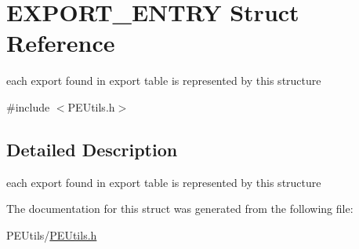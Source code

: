 \hypertarget{struct_e_x_p_o_r_t___e_n_t_r_y}{}\section{E\+X\+P\+O\+R\+T\+\_\+\+E\+N\+T\+RY Struct Reference}
\label{struct_e_x_p_o_r_t___e_n_t_r_y}


each export found in export table is represented by this structure  




{\ttfamily \#include $<$P\+E\+Utils.\+h$>$}



\subsection{Detailed Description}
each export found in export table is represented by this structure 

The documentation for this struct was generated from the following file\+:\begin{DoxyCompactItemize}
\item 
P\+E\+Utils/\mbox{\hyperlink{_p_e_utils_8h}{P\+E\+Utils.\+h}}\end{DoxyCompactItemize}
